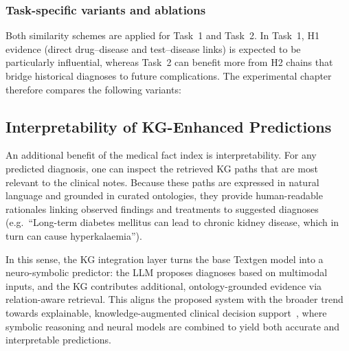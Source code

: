 \subsubsection{Task-specific variants and ablations}

Both similarity schemes are applied for Task~1 and Task~2. In Task~1, H1 evidence (direct drug--disease and test--disease links) is expected to be particularly influential, whereas Task~2 can benefit more from H2 chains that bridge historical diagnoses to future complications. The experimental chapter therefore compares the following variants:

\subsection{Interpretability of KG-Enhanced Predictions}
\label{subsec:kg-interpretability}

An additional benefit of the medical fact index is interpretability. For any predicted diagnosis, one can inspect the retrieved KG paths that are most relevant to the clinical notes. Because these paths are expressed in natural language and grounded in curated ontologies, they provide human-readable rationales linking observed findings and treatments to suggested diagnoses (e.g.\ ``Long-term diabetes mellitus can lead to chronic kidney disease, which in turn can cause hyperkalaemia'').

In this sense, the KG integration layer turns the base Textgen model into a neuro-symbolic predictor: the LLM proposes diagnoses based on multimodal inputs, and the KG contributes additional, ontology-grounded evidence via relation-aware retrieval. This aligns the proposed system with the broader trend towards explainable, knowledge-augmented clinical decision support~\cite{shang2019gamenet,choi2017gram}, where symbolic reasoning and neural models are combined to yield both accurate and interpretable predictions.





